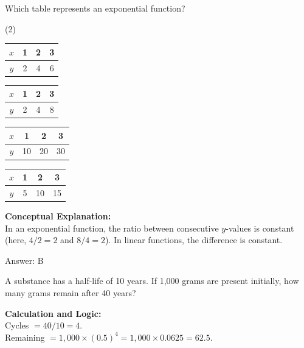 \documentclass[11pt,paper=a4,answers]{exam}
\begin{document}
\begin{questions}
\question
Which table represents an exponential function?
\begin{tasks}(2)
    \task \begin{tabular}{|c|c|c|c|} \hline $x$ & 1 & 2 & 3 \\ \hline $y$ & 2 & 4 & 6 \\ \hline \end{tabular}
    \task \begin{tabular}{|c|c|c|c|} \hline $x$ & 1 & 2 & 3 \\ \hline $y$ & 2 & 4 & 8 \\ \hline \end{tabular}
    \task \begin{tabular}{|c|c|c|c|} \hline $x$ & 1 & 2 & 3 \\ \hline $y$ & 10 & 20 & 30 \\ \hline \end{tabular}
    \task \begin{tabular}{|c|c|c|c|} \hline $x$ & 1 & 2 & 3 \\ \hline $y$ & 5 & 10 & 15 \\ \hline \end{tabular}
\end{tasks}

\begin{solution}
\textbf{Conceptual Explanation:} \\
In an exponential function, the ratio between consecutive $y$-values is constant (here, $4/2 = 2$ and $8/4 = 2$). In linear functions, the difference is constant.

\vspace{25pt}

Answer: \colorbox{yellow!100}{B}
\end{solution}

\vspace{40pt}

\question
A substance has a half-life of 10 years. If 1,000 grams are present initially, how many grams remain after 40 years?

\begin{solution}
\textbf{Calculation and Logic:} \\
Cycles $= 40/10 = 4$. \\
Remaining $= 1,000 \times (0.5)^4 = 1,000 \times 0.0625 = 62.5$.

\vspace{25pt}


\end{solution}
\end{questions}
\end{document}
